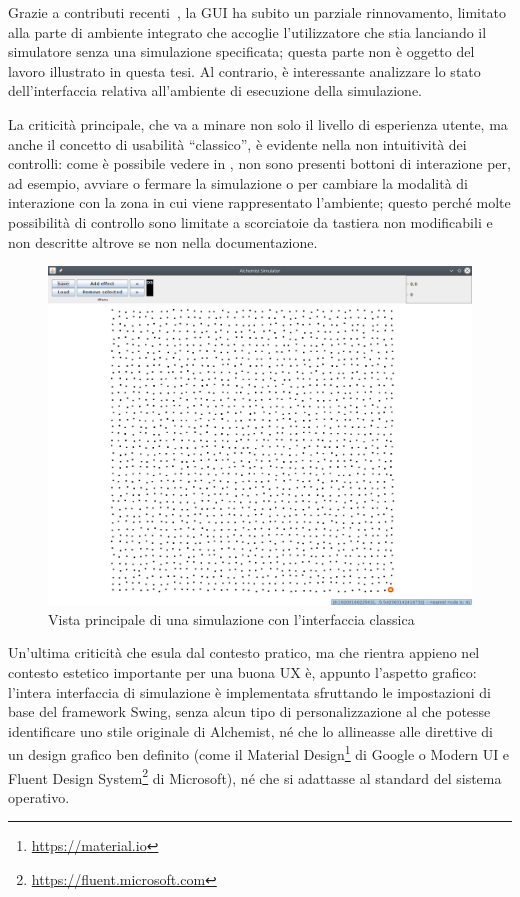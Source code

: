                 Grazie a contributi recenti~\cite{casadio}, la GUI ha subito un parziale rinnovamento, limitato alla parte di ambiente integrato che accoglie l'utilizzatore che stia lanciando il simulatore senza una simulazione specificata;
                questa parte non è oggetto del lavoro illustrato in questa tesi.
                Al contrario, è interessante analizzare lo stato dell'interfaccia relativa all'ambiente di esecuzione della simulazione.

                La criticità principale, che va a minare non solo il livello di esperienza utente, ma anche il concetto di usabilità  ``classico'', è evidente nella non intuitività dei controlli:
                come è possibile vedere in , non sono presenti bottoni di interazione per, ad esempio, avviare o fermare la simulazione o per cambiare la modalità di interazione con la zona in cui viene rappresentato l'ambiente;
                questo perché molte possibilità di controllo sono limitate a scorciatoie da tastiera non modificabili e non descritte altrove se non nella documentazione.

                \begin{figure}[htbp]
                    \centering
                    \includegraphics[scale=.35]{img/oldMain}
                    \caption{Vista principale di una simulazione con l'interfaccia classica}
                    \label{fig:oldMain}
                \end{figure}

                Un'ultima criticità che esula dal contesto pratico, ma che rientra appieno nel contesto estetico importante per una buona UX è, appunto l'aspetto grafico:
                l'intera interfaccia di simulazione è implementata sfruttando le impostazioni di base del framework Swing, senza alcun tipo di personalizzazione al  che potesse identificare uno stile originale di Alchemist, né che lo allineasse alle direttive di un design grafico ben definito (come il Material Design\footnote{\url{https://material.io}} di Google o Modern UI e Fluent Design System\footnote{\url{https://fluent.microsoft.com}} di Microsoft), né che si adattasse al  standard del sistema operativo.

